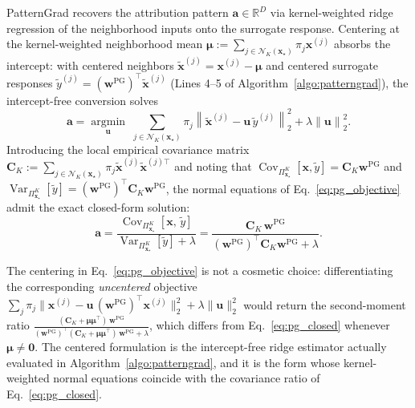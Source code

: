 \documentclass[pdflatex,sn-mathphys-num]{sn-jnl}
\theoremstyle{thmstyleone}
\theoremstyle{thmstyletwo}%
\theoremstyle{thmstylethree}%
\begin{document}
PatternGrad recovers the attribution pattern $\mathbf{a} \in \mathbb{R}^D$ via kernel-weighted ridge regression of the neighborhood inputs onto the surrogate response. Centering at the kernel-weighted neighborhood mean $\boldsymbol{\mu} \mathrel{:=} \sum_{j \in \mathcal{N}_K(\mathbf{x}_\star)} \pi_j \mathbf{x}^{(j)}$ absorbs the intercept: with centered neighbors $\tilde{\mathbf{x}}^{(j)} = \mathbf{x}^{(j)} - \boldsymbol{\mu}$ and centered surrogate responses $\tilde{y}^{(j)} = (\mathbf{w}^{\text{PG}})^\top \tilde{\mathbf{x}}^{(j)}$ (Lines 4--5 of Algorithm~\ref{algo:patterngrad}), the intercept-free conversion solves
\begin{equation}
    \mathbf{a} = \operatorname*{argmin}_{\mathbf{u}} \; \sum_{j \in \mathcal{N}_K(\mathbf{x}_\star)} \pi_j \left\| \tilde{\mathbf{x}}^{(j)} - \mathbf{u}\, \tilde{y}^{(j)} \right\|_2^2 + \lambda \left\| \mathbf{u} \right\|_2^2.
    \label{eq:pg_objective}
\end{equation}
Introducing the local empirical covariance matrix $\mathbf{C}_K \mathrel{:=} \sum_{j \in \mathcal{N}_K(\mathbf{x}_\star)} \pi_j \tilde{\mathbf{x}}^{(j)} \tilde{\mathbf{x}}^{(j)\top}$ and noting that $\operatorname{Cov}_{\Pi^K_{\mathbf{x}_\star}}[\mathbf{x}, \tilde{y}] = \mathbf{C}_K \mathbf{w}^{\text{PG}}$ and $\operatorname{Var}_{\Pi^K_{\mathbf{x}_\star}}[\tilde{y}] = (\mathbf{w}^{\text{PG}})^\top \mathbf{C}_K \mathbf{w}^{\text{PG}}$, the normal equations of Eq.~\eqref{eq:pg_objective} admit the exact closed-form solution:
\begin{equation}
    \mathbf{a} = \frac{\operatorname{Cov}_{\Pi^K_{\mathbf{x}_\star}}\!\left[\mathbf{x},\, \tilde{y}\right]}{\operatorname{Var}_{\Pi^K_{\mathbf{x}_\star}}[\tilde{y}] + \lambda} = \frac{\mathbf{C}_K\, \mathbf{w}^{\text{PG}}}{(\mathbf{w}^{\text{PG}})^\top \mathbf{C}_K \mathbf{w}^{\text{PG}} + \lambda}.
    \label{eq:pg_closed}
\end{equation}

The centering in Eq.~\eqref{eq:pg_objective} is not a cosmetic choice: differentiating the corresponding \emph{uncentered} objective $\sum_j \pi_j \|\mathbf{x}^{(j)} - \mathbf{u}\,(\mathbf{w}^{\text{PG}})^\top \mathbf{x}^{(j)}\|_2^2 + \lambda\|\mathbf{u}\|_2^2$ would return the second-moment ratio $\frac{(\mathbf{C}_K + \boldsymbol{\mu}\boldsymbol{\mu}^\top)\,\mathbf{w}^{\text{PG}}}{(\mathbf{w}^{\text{PG}})^\top (\mathbf{C}_K + \boldsymbol{\mu}\boldsymbol{\mu}^\top)\,\mathbf{w}^{\text{PG}} + \lambda}$, which differs from Eq.~\eqref{eq:pg_closed} whenever $\boldsymbol{\mu} \neq \mathbf{0}$. The centered formulation is the intercept-free ridge estimator actually evaluated in Algorithm~\ref{algo:patterngrad}, and it is the form whose kernel-weighted normal equations coincide with the covariance ratio of Eq.~\eqref{eq:pg_closed}.
\end{document}

